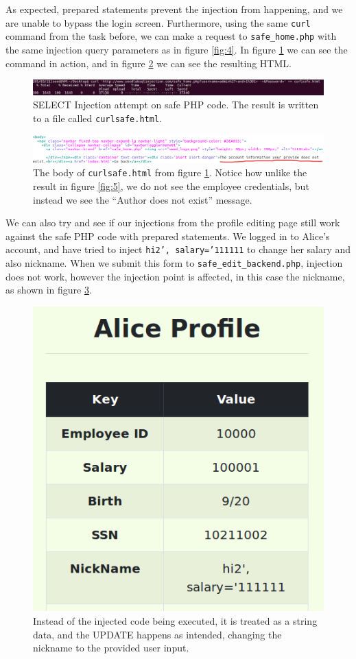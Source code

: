 \documentclass[12pt,reqno]{amsart}
\newcommand{\code}[1]{\texttt{#1}}
\begin{document}
As expected, prepared statements prevent the injection from happening, and we are unable to bypass the login screen. Furthermore, using the same \code{curl} command from the task before,  we can make a request to \code{safe\_home.php} with the same injection query parameters as in figure \ref{fig:4}. In figure \ref{fig:10} we can see the command in action, and in figure \ref{fig:11} we can see the resulting HTML. 

\begin{figure}[h]
  \includegraphics[width=\linewidth]{img/SAFE_CURL_EXAMPLE_CMD.png}
  \caption{SELECT Injection attempt on safe PHP code. The result is written to a file called \code{curlsafe.html}.}
  \label{fig:10}
\end{figure}


\begin{figure}[h]
  \includegraphics[width=\linewidth]{img/SAFE_CURL_EXAMPLE_GEDIT.png}
  \caption{The body of \code{curlsafe.html} from figure \ref{fig:10}. Notice how unlike the result in figure \ref{fig:5}, we do not see the employee credentials, but instead we see the ``Author does not exist'' message.}
  \label{fig:11}
\end{figure}

We can also try and see if our injections from the profile editing page still work against the safe PHP code with prepared statements. We logged in to Alice's account, and have tried to inject \code{hi2', salary='111111} to change her salary and also nickname. When we submit this form to \code{safe\_edit\_backend.php}, injection does not work, however the injection point is affected, in this case the nickname, as shown in figure \ref{fig:12}.

\begin{figure}[h]
  \includegraphics[width=0.35\linewidth]{img/SQL_INJECT_ALICE_SAFE.png}
  \caption{Instead of the injected code being executed, it is treated as a string data, and the UPDATE happens as intended, changing the nickname to the provided user input.}
  \label{fig:12}
\end{figure}
\end{document}
